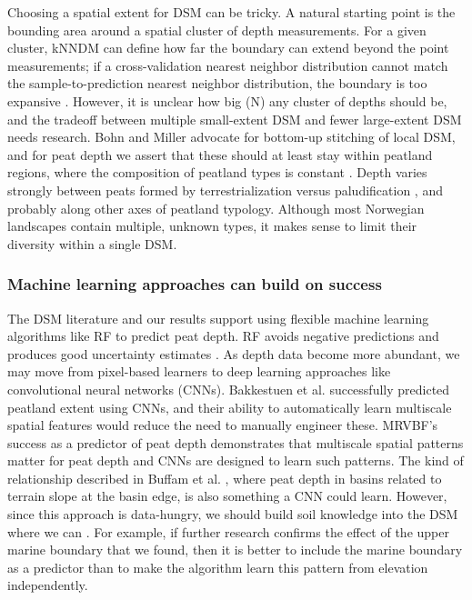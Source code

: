 \documentclass[soil, manuscript]{copernicus}
\begin{document}
Choosing a spatial extent for DSM can be tricky.
A natural starting point is the bounding area around a spatial cluster of depth measurements.
For a given cluster, kNNDM can define how far the boundary can extend beyond the point measurements; if a cross-validation nearest neighbor distribution cannot match the sample-to-prediction nearest neighbor distribution, the boundary is too expansive \citep{meyerMachineLearningbasedGlobal2022, linnenbrinkKNNDMCVKfold2024}.
However, it is unclear how big (N) any cluster of depths should be, and the tradeoff between multiple small-extent DSM and fewer large-extent DSM needs research.
Bohn and Miller \citeyearpar{bohnLocallyEnhancedDigital2024} advocate for bottom-up stitching of local DSM, and for peat depth we assert that these should at least stay within peatland regions, where the composition of peatland types is constant \citep[e.g.][]{moenVegetasjonstyper1998}.
Depth varies strongly between peats formed by terrestrialization versus paludification \citep{buffamFillingHolesRegional2010}, and probably along other axes of peatland typology.
Although most Norwegian landscapes contain multiple, unknown types, it makes sense to limit their diversity within a single DSM.

\subsubsection{Machine learning approaches can build on success}

The DSM literature and our results support using flexible machine learning algorithms like RF to predict peat depth.
RF avoids negative predictions \citep[c.f.][]{kogantiMappingPeatDepth2023} and produces good uncertainty estimates \citep[our study,][]{vaysseUsingQuantileRegression2017, takoutsingComparingPredictionPerformance2022}.
As depth data become more abundant, we may move from pixel-based learners to deep learning approaches like convolutional neural networks (CNNs).
Bakkestuen et al. \citeyearpar{bakkestuenDelineationWetlandAreas2023} successfully predicted peatland extent using CNNs, and their ability to automatically learn multiscale spatial features would reduce the need to manually engineer these.
MRVBF's success as a predictor of peat depth demonstrates that multiscale spatial patterns matter for peat depth and CNNs are designed to learn such patterns.
The kind of relationship described in Buffam et al. \citeyearpar{buffamFillingHolesRegional2010}, where peat depth in basins related to terrain slope at the basin edge, is also something a CNN could learn.
However, since this approach is data-hungry, we should build soil knowledge into the DSM where we can \citep{minasnySoilScienceInformedMachine2024}.
For example, if further research confirms the effect of the upper marine boundary that we found, then it is better to include the marine boundary as a predictor than to make the algorithm learn this pattern from elevation independently.
\end{document}
